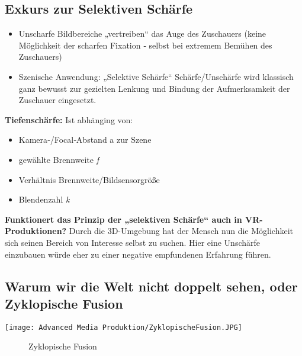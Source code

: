 \subsection{Exkurs zur Selektiven Schärfe}

\begin{itemize}
\item Unscharfe Bildbereiche „vertreiben“ das Auge des Zuschauers
(keine Möglichkeit der scharfen Fixation ‐ selbst bei extremem Bemühen des Zuschauers)
\item Szenische Anwendung: „Selektive Schärfe“
Schärfe/Unschärfe wird klassisch ganz bewusst zur gezielten Lenkung und Bindung der Aufmerksamkeit der Zuschauer eingesetzt.
\end{itemize}

\textbf{Tiefenschärfe:}
Ist abhänging von: 
\begin{itemize}
\item Kamera‐/Focal‐Abstand a zur Szene
\item gewählte Brennweite \textit{f} 
\item Verhältnis Brennweite/Bildsensorgröße
\item Blendenzahl \textit{k} 
\end{itemize} 

\textbf{Funktionert das Prinzip der „selektiven Schärfe“ auch in VR-Produktionen?}
Durch die 3D-Umgebung hat der Mensch nun die Möglichkeit sich seinen Bereich von Interesse selbst zu suchen. Hier eine Unschärfe einzubauen würde eher zu einer negative empfundenen Erfahrung führen. \\

\subsection{Warum wir die Welt nicht doppelt sehen, oder Zyklopische Fusion}

\texttt{[image: Advanced Media Produktion/ZyklopischeFusion.JPG]}

\begin{figure}[htbp] 
  \centering
     
  \caption{Zyklopische Fusion}
  \label{fig:Bild1}
\end{figure}

